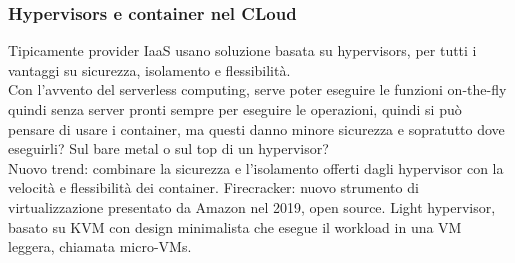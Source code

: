 \documentclass{article}
\begin{document}
\subsubsection{Hypervisors e container nel CLoud}
Tipicamente provider IaaS usano soluzione basata su hypervisors, per tutti i vantaggi su sicurezza, isolamento e flessibilità.\\ Con l'avvento del serverless computing, serve poter eseguire le funzioni on-the-fly quindi senza server pronti sempre per eseguire le operazioni, quindi si può pensare di usare i container, ma questi danno minore sicurezza e sopratutto dove eseguirli? Sul bare metal o sul top di un hypervisor?\\ Nuovo trend: combinare la sicurezza e l'isolamento offerti dagli hypervisor con la velocità e flessibilità dei container. Firecracker: nuovo strumento di virtualizzazione presentato da Amazon nel 2019, open source. Light hypervisor, basato su KVM con design minimalista che esegue il workload in una VM leggera, chiamata micro-VMs.
\end{document}
